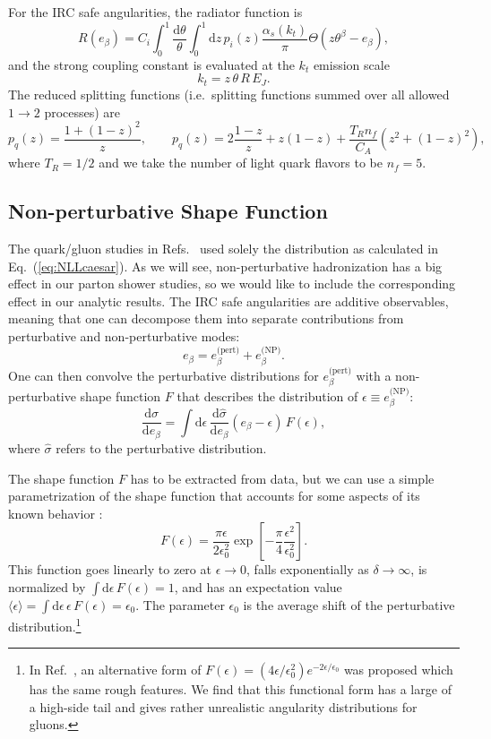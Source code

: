 \documentclass[11pt,letterpaper]{article}
\newcommand{\df}{\text{d}}
\newcommand{\vev}[1]{\langle #1 \rangle}
\DeclareRobustCommand{\Eq}[1]{Eq.~(\ref{#1})}
\DeclareRobustCommand{\Ref}[1]{Ref.~\cite{#1}}
\DeclareRobustCommand{\Refs}[1]{Refs.~\cite{#1}}
\newcommand{\be}{\begin{equation}}
\newcommand{\ee}{\end{equation}}
\begin{document}
For the IRC safe angularities, the radiator function is \cite{}
\begin{equation} \label{eq:radiatorC1}
R(e_\beta) = C_i \int_0^{1} \frac{\df \theta}{\theta}\int_0^1 \df  z\, p_i(z) \frac{\alpha_s(k_t)}{\pi} \Theta\left(z \theta^\beta -e_\beta \right),
\end{equation}
and the strong coupling constant is evaluated at the $k_t$ emission scale
\be
k_t = z \, \theta \,  R \, E_J.
\ee
The reduced splitting functions (i.e.~splitting functions summed over all allowed $1 \to 2$ processes) are 
\be
p_q(z) = \frac{1 + (1-z)^2}{z}, \qquad p_q(z) = 2 \frac{1-z}{z} + z(1-z) + \frac{T_R n_f}{C_A} (z^2 + (1-z)^2),
\ee
where $T_R = 1/2$ and we take the number of light quark flavors to be $n_f = 5$.

\subsection{Non-perturbative Shape Function}
\label{subsec:shapefuncdef}

The quark/gluon studies in \Refs{} used solely the distribution as calculated in \Eq{eq:NLLcaesar}.  As we will see, non-perturbative hadronization has a big effect in our parton shower studies, so we would like to include the corresponding effect in our analytic results.  The IRC safe angularities are additive observables, meaning that one can decompose them into separate contributions from perturbative and non-perturbative modes:
\be
e_\beta = e_\beta^{\text{(pert)}} + e_\beta^{\text{(NP)}}.
\ee
One can then convolve the perturbative distributions for $e_\beta^{\text{(pert)}}$ with a non-perturbative shape function $F$ that describes the distribution of $\epsilon \equiv e_\beta^{\text{(NP)}}$:
\be
\frac{\df \sigma}{\df e_\beta} = \int \df \epsilon \,  \frac{\df \hat{\sigma}}{\df e_\beta}(e_\beta - \epsilon) \, F(\epsilon),
\ee
where $\hat{\sigma}$ refers to the perturbative distribution.

The shape function $F$ has to be extracted from data, but we can use a simple parametrization of the shape function that accounts for some aspects of its known behavior \cite{}:
\be
F(\epsilon) = \frac{\pi \epsilon}{2 \epsilon_0^2} \exp\left[-\frac{\pi}{4} \frac{\epsilon^2}{\epsilon_0^2} \right].
\ee
This function goes linearly to zero at $\epsilon \to 0$, falls exponentially as $\delta \to \infty$, is normalized by $\int \df \epsilon \,  F(\epsilon) = 1$, and has an expectation value $\vev{\epsilon} = \int \df \epsilon \, \epsilon \, F(\epsilon) = \epsilon_0$.  The parameter $\epsilon_0$ is the average shift of the perturbative distribution.\footnote{In \Ref{}, an alternative form of $F(\epsilon) = (4\epsilon/\epsilon_0^2) e^{-2 \epsilon/\epsilon_0}$ was proposed which has the same rough features.  We find that this functional form has a large of a high-side tail and gives rather unrealistic angularity distributions for gluons.}
\end{document}
